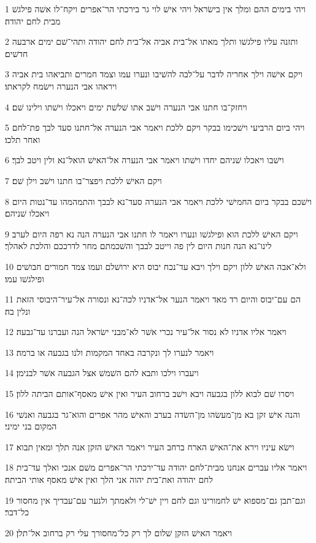 \par 1 ויהי בימים ההם ומלך אין בישׂראל ויהי אישׁ לוי גר בירכתי הר־אפרים ויקח־לו אשׁה פילגשׁ מבית לחם יהודה׃
\par 2 ותזנה עליו פילגשׁו ותלך מאתו אל־בית אביה אל־בית לחם יהודה ותהי־שׁם ימים ארבעה חדשׁים׃
\par 3 ויקם אישׁה וילך אחריה לדבר על־לבה להשׁיבו ונערו עמו וצמד חמרים ותביאהו בית אביה ויראהו אבי הנערה וישׂמח לקראתו׃
\par 4 ויחזק־בו חתנו אבי הנערה וישׁב אתו שׁלשׁת ימים ויאכלו וישׁתו וילינו שׁם׃
\par 5 ויהי ביום הרביעי וישׁכימו בבקר ויקם ללכת ויאמר אבי הנערה אל־חתנו סעד לבך פת־לחם ואחר תלכו׃
\par 6 וישׁבו ויאכלו שׁניהם יחדו וישׁתו ויאמר אבי הנערה אל־האישׁ הואל־נא ולין ויטב לבך׃
\par 7 ויקם האישׁ ללכת ויפצר־בו חתנו וישׁב וילן שׁם׃
\par 8 וישׁכם בבקר ביום החמישׁי ללכת ויאמר אבי הנערה סעד־נא לבבך והתמהמהו עד־נטות היום ויאכלו שׁניהם׃
\par 9 ויקם האישׁ ללכת הוא ופילגשׁו ונערו ויאמר לו חתנו אבי הנערה הנה נא רפה היום לערב לינו־נא הנה חנות היום לין פה וייטב לבבך והשׁכמתם מחר לדרככם והלכת לאהלך׃
\par 10 ולא־אבה האישׁ ללון ויקם וילך ויבא עד־נכח יבוס היא ירושׁלם ועמו צמד חמורים חבושׁים ופילגשׁו עמו׃
\par 11 הם עם־יבוס והיום רד מאד ויאמר הנער אל־אדניו לכה־נא ונסורה אל־עיר־היבוסי הזאת ונלין בה׃
\par 12 ויאמר אליו אדניו לא נסור אל־עיר נכרי אשׁר לא־מבני ישׂראל הנה ועברנו עד־גבעה׃
\par 13 ויאמר לנערו לך ונקרבה באחד המקמות ולנו בגבעה או ברמה׃
\par 14 ויעברו וילכו ותבא להם השׁמשׁ אצל הגבעה אשׁר לבנימן׃
\par 15 ויסרו שׁם לבוא ללון בגבעה ויבא וישׁב ברחוב העיר ואין אישׁ מאסף־אותם הביתה ללון׃
\par 16 והנה אישׁ זקן בא מן־מעשׂהו מן־השׂדה בערב והאישׁ מהר אפרים והוא־גר בגבעה ואנשׁי המקום בני ימיני׃
\par 17 וישׂא עיניו וירא את־האישׁ הארח ברחב העיר ויאמר האישׁ הזקן אנה תלך ומאין תבוא׃
\par 18 ויאמר אליו עברים אנחנו מבית־לחם יהודה עד־ירכתי הר־אפרים משׁם אנכי ואלך עד־בית לחם יהודה ואת־בית יהוה אני הלך ואין אישׁ מאסף אותי הביתה׃
\par 19 וגם־תבן גם־מספוא ישׁ לחמורינו וגם לחם ויין ישׁ־לי ולאמתך ולנער עם־עבדיך אין מחסור כל־דבר׃
\par 20 ויאמר האישׁ הזקן שׁלום לך רק כל־מחסורך עלי רק ברחוב אל־תלן׃
